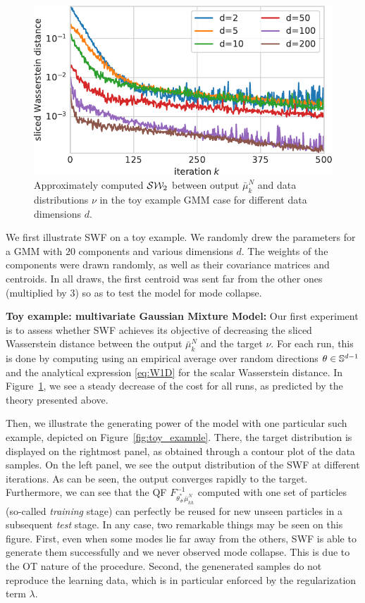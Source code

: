 \begin{figure}
\begin{centering}
\includegraphics[width=0.40\columnwidth]{figures/SW2_cost-crop.pdf}
\par\end{centering}
\caption{Approximately computed ${\cal S}{\cal W}_2$ between output $\bar{\mu}_{k}^{N}$ and data distributions $\nu$ in the toy example GMM case for different data dimensions $d$.
\label{fig:toy_sw}}
\vspace{-10pt}
\end{figure}
We first illustrate SWF on a toy example. We randomly drew the parameters for a GMM with $20$ components and various dimensions $d$. The weights of the components were drawn randomly, as well as their covariance matrices and centroids. In all draws, the first centroid was sent far from the other ones (multiplied by $3$) so as to test the model for mode collapse.





\textbf{Toy example: multivariate Gaussian Mixture Model: }
Our first experiment is to assess whether SWF achieves its objective of decreasing the sliced Wasserstein distance between the output $\bar{\mu}_{k}^{N}$ and the target $\nu$. For each run, this is done by computing \label{eqn:sw} using an empirical average over random directions $\theta\in\mathbb{S}^{d-1}$ and the analytical expression \eqref{eq:W1D} for the scalar Wasserstein distance. In Figure~\ref{fig:toy_sw}, we see a steady decrease of the cost for all runs, as predicted by the theory presented above.

Then, we illustrate the generating power of the model with one particular such example, depicted on Figure~\ref{fig:toy_example}. There, the target distribution is displayed on the rightmost panel, as obtained through a contour plot of the data samples. On the left panel, we see the output distribution of the SWF at different iterations. As can be seen, the output converges rapidly to the target. Furthermore, we can see that the QF $F^{-1}_{\theta^*_\#\bar{\mu}_{kh}^{N}}$ computed with one set of particles (so-called \textit{training} stage) can perfectly be reused for new unseen particles in a subsequent \textit{test} stage. In any case, two remarkable things may be seen on this figure. First, even when some modes lie far away from the others, SWF is able to generate them successfully and we never observed mode collapse. This is due to the OT nature of the procedure. Second, the genenerated samples do not reproduce the learning data, which is in particular enforced by the regularization term $\lambda$.




